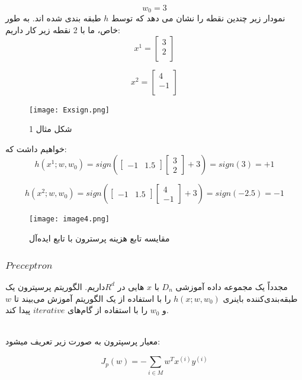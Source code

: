 \documentclass[12pt]{article}
\begin{document}
\[
w_0=3
\]
نمودار زیر چندین نقطه را نشان می دهد که توسط $h$ طبقه بندی شده اند. به طور خاص، ما با 2 نقطه زیر کار داریم:
\[
x^1 =\begin{bmatrix}
3 \\
2 \\
\end{bmatrix}
\]

\[
x^2 =\begin{bmatrix}
4 \\
-1 \\
\end{bmatrix}
\]

\begin{figure}[h]
    \centering
    \texttt{[image: Exsign.png]}
    \caption{شکل مثال 1}
\label{fig:f1}
\end{figure}

خواهیم داشت که:
\[
h(x^1; w,w_0) = sign \left( \begin{bmatrix} -1 & 1.5\end{bmatrix} \begin{bmatrix} 3 \\ 2\end{bmatrix}+ 3 \right)  = sign(3) = +1
\]

\[
h(x^2; w,w_0) = sign \left( \begin{bmatrix} -1 & 1.5\end{bmatrix} \begin{bmatrix} 4 \\ -1\end{bmatrix}+ 3 \right)  = sign(-2.5) = -1
\]

\begin{figure}[h]
    \centering
    \texttt{[image: image4.png]}
    \caption{مقایسه تابع هزینه پرسترون با تابع ایده‌آل}
    \label{fig:}
\end{figure}

\subsubsection{$Preceptron$}

مجدداً یک مجموعه داده آموزشی $D_n$ با $x$ هایی در $R^d$داریم. الگوریتم پرسپترون یک طبقه‌بندی‌کننده باینری $h(x; w, w_0)$ را با استفاده از یک الگوریتم آموزش می‌بیند تا $w$ و $w_0$ را با استفاده از گام‌های $iterative$ پیدا کند.

\\ 
معيار پرسپترون به صورت زير تعريف ميشود:

\[ J_p(w) = - \sum_{i \in M} w^T x^{(i)} y^{(i)} \]
\end{document}
